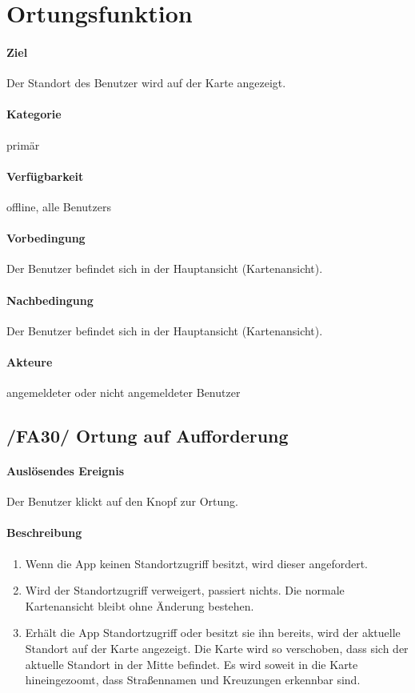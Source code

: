 \section{Ortungsfunktion}
\paragraph{Ziel}
Der Standort des \Gls{Benutzer} wird auf der \Gls{Karte} angezeigt.
\paragraph{Kategorie}
primär
\paragraph{Verfügbarkeit}
offline, alle \Glspl{Benutzer}
\paragraph{Vorbedingung}
Der \Gls{Benutzer} befindet sich in der Hauptansicht (\Gls{Kartenansicht}).
\paragraph{Nachbedingung}
Der \Gls{Benutzer} befindet sich in der Hauptansicht (\Gls{Kartenansicht}).
\paragraph{Akteure}
angemeldeter oder nicht angemeldeter \Gls{Benutzer}

\subsection*{/FA30/ Ortung auf Aufforderung}
\label{/FA30/}
\paragraph{Auslösendes Ereignis}
Der \Gls{Benutzer} klickt auf den Knopf zur Ortung.
\paragraph{Beschreibung}
\begin{enumerate}
    \item Wenn die App keinen Standortzugriff besitzt, wird dieser angefordert.
    \item Wird der Standortzugriff verweigert, passiert nichts. Die normale \Gls{Kartenansicht} bleibt ohne Änderung bestehen.
    \item Erhält die App Standortzugriff oder besitzt sie ihn bereits, wird der aktuelle Standort auf der \Gls{Karte} angezeigt. Die \Gls{Karte} wird so verschoben, dass sich der aktuelle Standort in der Mitte befindet. Es wird soweit in die \Gls{Karte} hineingezoomt, dass Straßennamen und Kreuzungen erkennbar sind.
\end{enumerate}

